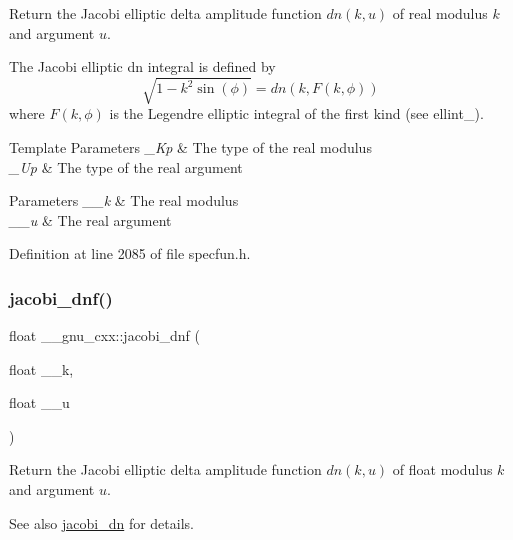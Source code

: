 Return the Jacobi elliptic delta amplitude function $ dn(k,u) $ of real modulus $ k $ and argument $ u $.

The Jacobi elliptic {\ttfamily dn} integral is defined by \[ \sqrt{1 - k^2\sin(\phi)} = dn(k, F(k,\phi)) \] where $ F(k,\phi) $ is the Legendre elliptic integral of the first kind (see ellint\+\_).


\begin{DoxyTemplParams}{Template Parameters}
{\em \+\_\+\+Kp} & The type of the real modulus \\
\hline
{\em \+\_\+\+Up} & The type of the real argument \\
\hline
\end{DoxyTemplParams}

\begin{DoxyParams}{Parameters}
{\em \+\_\+\+\_\+k} & The real modulus \\
\hline
{\em \+\_\+\+\_\+u} & The real argument \\
\hline
\end{DoxyParams}


Definition at line 2085 of file specfun.\+h.

\mbox{\label{group__gnu__math__spec__func_gae96327d678adc6b5c4051f1c3649549a}} 
\subsubsection{\texorpdfstring{jacobi\+\_\+dnf()}{jacobi\_dnf()}}
{\footnotesize\ttfamily float \+\_\+\+\_\+gnu\+\_\+cxx\+::jacobi\+\_\+dnf (\begin{DoxyParamCaption}\item[{float}]{\+\_\+\+\_\+k,  }\item[{float}]{\+\_\+\+\_\+u }\end{DoxyParamCaption})\hspace{0.3cm}{\ttfamily [inline]}}

Return the Jacobi elliptic delta amplitude function $ dn(k,u) $ of {\ttfamily float} modulus $ k $ and argument $ u $.

\begin{DoxySeeAlso}{See also}
\hyperlink{group__gnu__math__spec__func_ga0f8fa8d6a77dbc2089d65f3f16876aa9}{jacobi\+\_\+dn} for details. 
\end{DoxySeeAlso}


